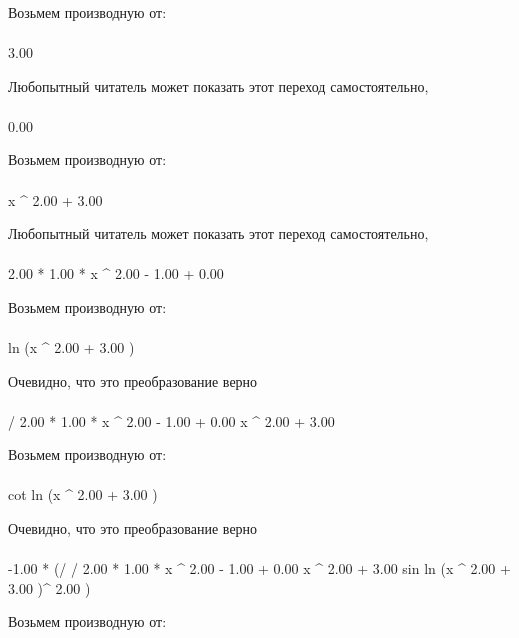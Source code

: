 Возьмем производную от:
\begin{gather}
\end{gather}
\begin{}
3.00 \\
\end{}
Любопытный читатель может показать этот переход самостоятельно, 
\begin{gather}
\end{gather}
\begin{}
0.00 \\
\end{}
Возьмем производную от:
\begin{gather}
\end{gather}
\begin{}
x ^ {2.00 }+ 3.00 \\
\end{}
Любопытный читатель может показать этот переход самостоятельно, 
\begin{gather}
\end{gather}
\begin{}
2.00 * 1.00 * x ^ {2.00 - 1.00 }+ 0.00 \\
\end{}
Возьмем производную от:
\begin{gather}
\end{gather}
\begin{}
ln (x ^ {2.00 }+ 3.00 )\\
\end{}
Очевидно, что это преобразование верно
\begin{gather}
\end{gather}
\begin{}
/ {2.00 * 1.00 * x ^ {2.00 - 1.00 }+ 0.00 }{x ^ {2.00 }+ 3.00 }\\
\end{}
Возьмем производную от:
\begin{gather}
\end{gather}
\begin{}
cot ln (x ^ {2.00 }+ 3.00 )\\
\end{}
Очевидно, что это преобразование верно
\begin{gather}
\end{gather}
\begin{}
-1.00 * (/ {/ {2.00 * 1.00 * x ^ {2.00 - 1.00 }+ 0.00 }{x ^ {2.00 }+ 3.00 }}{sin ln (x ^ {2.00 }+ 3.00 )^ {2.00 }})\\
\end{}
Возьмем производную от:
\begin{gather}
\end{gather}
